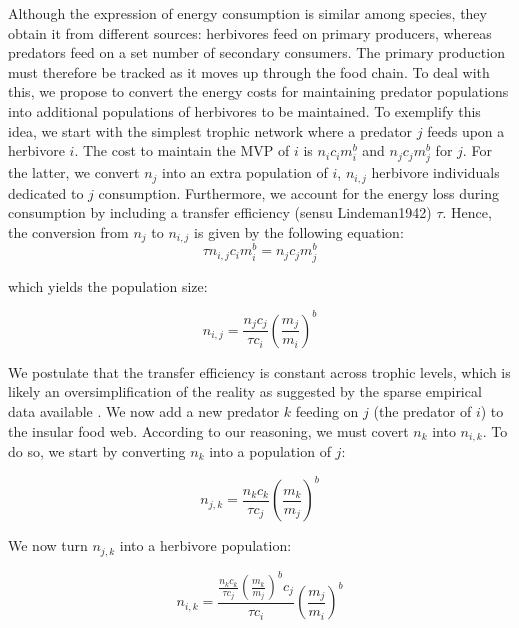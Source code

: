 Although the expression of energy consumption is similar among species,
they obtain it from different sources: herbivores feed on primary
producers, whereas predators feed on a set number of secondary
consumers. The primary production must therefore be tracked as it moves
up through the food chain. To deal with this, we propose to convert the
energy costs for maintaining predator populations into additional
populations of herbivores to be maintained. To exemplify this idea, we
start with the simplest trophic network where a predator \(j\) feeds
upon a herbivore \(i\). The cost to maintain the MVP of \(i\) is
\(n_ic_im_i^b\) and \(n_jc_jm_j^b\) for \(j\). For the latter, we
convert \(n_j\) into an extra population of \(i\), \(n_{i,j}\) herbivore
individuals dedicated to \(j\) consumption. Furthermore, we account for
the energy loss during consumption by including a transfer efficiency
(sensu Lindeman1942) \(\tau\). Hence, the conversion from \(n_{j}\) to
\(n_{i,j}\) is given by the following equation:
\begin{equation} \tau n_{i,j} c_im_i^b = n_jc_jm_j^b \label{eq:id1}\end{equation}

which yields the population size:

\begin{equation} n_{i,j} = \frac{n_jc_j}{\tau c_i} \left( \frac{m_j}{m_i} \right)^b \label{eq:id2}\end{equation}

We postulate that the transfer efficiency is constant across trophic
levels, which is likely an oversimplification of the reality as
suggested by the sparse empirical data available
\citep{Trebilco2013, Brown2003}. We now add a new predator \(k\) feeding
on \(j\) (the predator of \(i\)) to the insular food web. According to
our reasoning, we must covert \(n_k\) into \(n_{i,k}\). To do so, we
start by converting \(n_k\) into a population of \(j\):

\begin{equation} n_{j,k} = \frac{n_kc_k}{\tau c_j} \left( \frac{m_k}{m_j} \right)^b \label{eq:id2}\end{equation}

We now turn \(n_{j,k}\) into a herbivore population:

\begin{equation} n_{i,k} = \frac{\frac{n_kc_k}{\tau c_j} \left( \frac{m_k}{m_j} \right)^bc_j}{\tau c_i} \left( \frac{m_j}{m_i} \right)^b \label{eq:id3}\end{equation}

